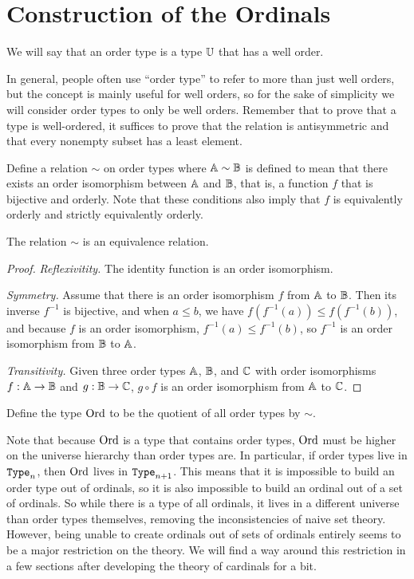 \documentclass[../../math.tex]{subfiles}
\begin{document}
\section{Construction of the Ordinals}

\begin{definition}
    We will say that an order type is a type $\mathbb{U}$ that has a well order.
\end{definition}

In general, people often use ``order type'' to refer to more than just well
orders, but the concept is mainly useful for well orders, so for the sake of
simplicity we will consider order types to only be well orders.  Remember that
to prove that a type is well-ordered, it suffices to prove that the relation is
antisymmetric and that every nonempty subset has a least element.

\begin{definition}
    Define a relation $\sim$ on order types where $\mathbb{A} \sim \mathbb{B}$ is defined to
    mean that there exists an order isomorphism between $\mathbb{A}$ and $\mathbb{B}$, that is,
    a function $f$ that is bijective and orderly.  Note that these conditions
    also imply that $f$ is equivalently orderly and strictly equivalently
    orderly.
\end{definition}

\begin{lemma}
    The relation $\sim$ is an equivalence relation.
\end{lemma}
\begin{proof}
    \textit{Reflexivitity.}  The identity function is an order isomorphism.

    \textit{Symmetry.}  Assume that there is an order isomorphism $f$ from $\mathbb{A}$
    to $\mathbb{B}$.  Then its inverse $f^{-1}$ is bijective, and when $a \leq b$, we
    have $f(f^{-1}(a)) \leq f(f^{-1}(b))$, and because $f$ is an order
    isomorphism, $f^{-1}(a) \leq f^{-1}(b)$, so $f^{-1}$ is an order isomorphism
    from $\mathbb{B}$ to $\mathbb{A}$.

    \textit{Transitivity.}  Given three order types $\mathbb{A}$, $\mathbb{B}$, and $\mathbb{C}$ with
    order isomorphisms $f : \mathbb{A} \to \mathbb{B}$ and $g : \mathbb{B} \to \mathbb{C}$, $g \circ f$ is an
    order isomorphism from $\mathbb{A}$ to $\mathbb{C}$.
\end{proof}

\begin{definition}
    Define the type $\operatorname{Ord}$ to be the quotient of all order types by $\sim$.
\end{definition}

Note that because $\operatorname{Ord}$ is a type that contains order types, $\operatorname{Ord}$ must be
higher on the universe hierarchy than order types are.  In particular, if order
types live in $\Type_n$, then $\operatorname{Ord}$ lives in $\Type_{n+1}$.  This means that it
is impossible to build an order type out of ordinals, so it is also impossible
to build an ordinal out of a set of ordinals.  So while there is a type of all
ordinals, it lives in a different universe than order types themselves, removing
the inconsistencies of naive set theory.  However, being unable to create
ordinals out of sets of ordinals entirely seems to be a major restriction on the
theory.  We will find a way around this restriction in a few sections after
developing the theory of cardinals for a bit.
\end{document}
